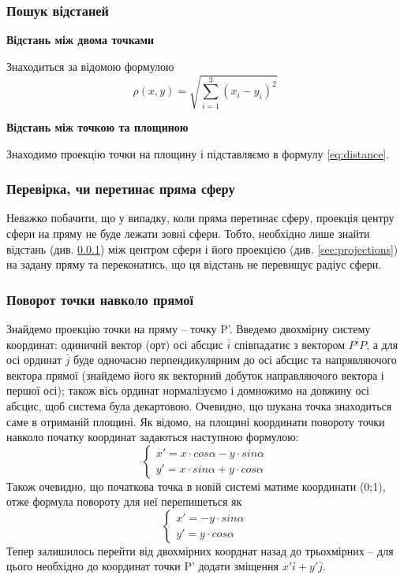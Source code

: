 \documentclass[a4paper,12pt]{article}
\begin{document}
\subsubsection{Пошук відстаней} \label{sec:distance}
\textbf{Відстань між двома точками}

Знаходиться за відомою формулою
\begin{equation} \label{eq:distance}
  \rho(x,y) = \sqrt{\sum \limits_{i=1}^3 (x_i - y_i)^2}
\end{equation}

\textbf{Відстань між точкою та площиною}

Знаходимо проекцію точки на площину і підставляємо в формулу \ref{eq:distance}.

\subsubsection{Перевірка, чи перетинає пряма сферу}
Неважко побачити, що у випадку, коли пряма перетинає сферу, проекція центру сфери на пряму не буде лежати зовні сфери. Тобто, необхідно лише знайти відстань (див. \ref{sec:distance}) між центром сфери і його проекцією (див. \ref{sec:projections}) на задану пряму та переконатись, що ця відстань не перевищує радіус сфери.

\subsubsection{Поворот точки навколо прямої}
Знайдемо проекцію точки на пряму -- точку P'. Введемо двохмірну систему координат: одиничнй вектор (орт) осі абсцис $\bar i$ співпадатиє з вектором $\overline{P'P}$, а для осі ординат $\bar j$ буде одночасно перпендикулярним до осі абсцис та напрявляючого вектора прямої (знайдемо його як векторний добуток направляючого вектора і першої осі); також вісь ординат нормалізуємо і домножимо на довжину осі абсцис, щоб система була декартовою. Очевидно, що шукана точка знаходиться саме в отриманій площині. Як відомо, на площині координати повороту точки навколо початку координат задаються наступною формулою:
\[
  \begin{cases}
    x' = x \cdot cos \alpha - y \cdot sin \alpha \\
    y' = x \cdot sin \alpha + y \cdot cos \alpha
  \end{cases}
\]
 Також очевидно, що початкова точка в новій системі матиме координати (0;1), отже формула повороту для неї перепишеться як
\[
  \begin{cases}
    x' = - y \cdot sin \alpha \\
    y' = y \cdot cos \alpha
  \end{cases}
\]
Тепер залишилось перейти від двохмірних коорднат назад до трьохмірних -- для цього необхідно до координат точки P' додати зміщення $x' \bar i + y' \bar j$.
\end{document}
